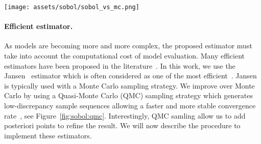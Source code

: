 \begin{figure*}[ht]
  \centering
  \texttt{[image: assets/sobol/sobol\_vs\_mc.png]}
  \caption{\textbf{Quasi-Monte Carlo vs. Crude Monte Carlo Sampling.} Comparison of Sampling Techniques in a Two-Dimensional Unit Cube: On the left, we observe a crude Monte Carlo sampling where points are distributed according to a uniform random sequence, exhibiting clusters and gaps due to the stochastic nature of the sampling process. On the right, a quasi-Monte Carlo sampling using a Sobol sequence is displayed, demonstrating a more uniform and structured distribution of points across the space, which is characteristic of low-discrepancy sequences that aim for even coverage in the unit cube $[0,1]^2$. This illustrates the advantage of quasi-Monte Carlo methods in achieving a more evenly distributed set of sample points, which can lead to more efficient numerical integration and optimization within multidimensional domains.}
  \label{fig:sobol:qmc}
\end{figure*}

\paragraph{Efficient estimator.} As models are becoming more and more complex, the proposed estimator must take into account the computational cost of model evaluation. Many efficient estimators have been proposed in the literature~\cite{iooss2015}. In this work, we use the Jansen~\cite{jansen1999} estimator which is often considered as one of the most efficient~\cite{puy2020comprehensive}.
Jansen is typically used with a Monte Carlo sampling strategy.
We improve over Monte Carlo by using a Quasi-Monte Carlo (QMC) sampling strategy which generates low-discrepancy sample sequences allowing a faster and more stable convergence rate~\cite{gerber2015}, see Figure~\ref{fig:sobol:qmc}.
Interestingly, QMC samling allow us to add posteriori points to refine the result.
We will now describe the procedure to implement these estimators.

